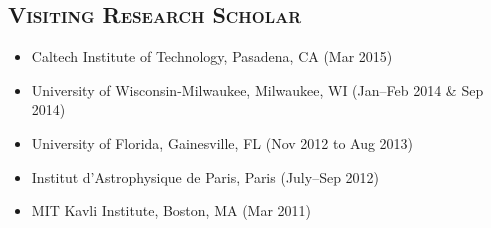 \documentclass[10pt,a4paper]{moderncv}
\begin{document}
\subsection{\textsc{Visiting Research Scholar}}
\begin{itemize}
\item Caltech Institute of Technology, Pasadena, CA (Mar 2015) %
\item University of Wisconsin-Milwaukee, Milwaukee, WI (Jan--Feb 2014 \& Sep 2014) %
\item University of Florida, Gainesville, FL (Nov 2012 to Aug 2013) %
\item Institut d'Astrophysique de Paris, Paris (July--Sep 2012) %
\item MIT Kavli Institute, Boston, MA (Mar 2011)%
\end{itemize}
\end{document}
